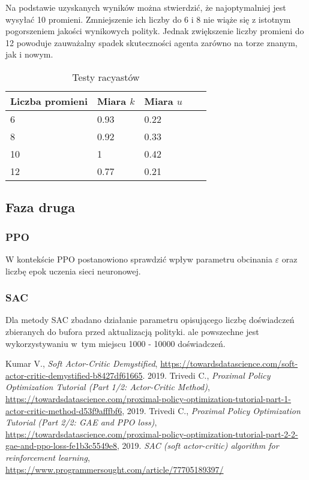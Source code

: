 \documentclass[a4paper,12pt]{article}
\begin{document}
Na podstawie uzyskanych wyników można stwierdzić, że najoptymalniej jest wysyłać 10 promieni. Zmniejszenie ich liczby do 6 i 8 nie wiąże się z istotnym pogorszeniem jakości wynikowych polityk. Jednak zwiększenie liczby promieni do 12 powoduje zauważalny spadek skuteczności agenta zarówno na torze znanym, jak i nowym.

\begin{table}[H]
	\centering
	\smallskip
	\begin{tabular}{|l|l|l|l|l|}
		\hline
		Liczba promieni & Miara $k$ & Miara $u$ \\
		\hline
		6 & 0.93 & 0.22 \\		
		8 & 0.92 & 0.33 \\		
		10 & 1 & 0.42 \\		
		12 & 0.77 & 0.21 \\\hline
	\end{tabular}
	\caption{Testy racyastów}
	\label{tab:raycast}
\end{table}


\subsection{Faza druga}
\subsubsection{PPO}
W kontekście PPO postanowiono sprawdzić wpływ parametru obcinania $\varepsilon$ oraz liczbę epok uczenia sieci neuronowej.

\subsubsection{SAC}
Dla metody SAC zbadano działanie parametru opisującego liczbę doświadczeń zbieranych do bufora przed aktualizacją polityki. ale powszechne jest wykorzystywaniu w~tym miejscu 1000 - 10000 doświadczeń.

\begin{thebibliography}{20}
	Kumar V., \textit{Soft Actor-Critic Demystified}, \url{https://towardsdatascience.com/soft-actor-critic-demystified-b8427df61665}. 2019.
	 Trivedi C., \textit{Proximal Policy Optimization Tutorial (Part 1/2: Actor-Critic Method)}, \url{https://towardsdatascience.com/proximal-policy-optimization-tutorial-part-1-actor-critic-method-d53f9afffbf6}, 2019.
	 Trivedi C., \textit{Proximal Policy Optimization Tutorial (Part 2/2: GAE and PPO loss)}, \url{https://towardsdatascience.com/proximal-policy-optimization-tutorial-part-2-2-gae-and-ppo-loss-fe1b3c5549e8}, 2019.
	 \textit{SAC (soft actor-critic) algorithm for reinforcement learning}, \url{https://www.programmersought.com/article/77705189397/}
\end{thebibliography}
\end{document}

